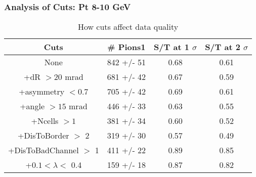 \frame
{
\frametitle{Analysis of Cuts: Pt  8-10 GeV}
\begin{table}
\caption{How cuts affect data quality}
\centering
\begin{tabular}{c c c c}
\hline\hline
Cuts & \# Pions1 & S/T at 1 $\sigma$ & S/T at 2 $\sigma$ \\ [0.5ex]
\hline
None &  842 +/-   51 & 0.68 & 0.61 \\ %
+dR $> 20$ mrad &  681 +/-   42 & 0.67 & 0.59 \\ %
+asymmetry $< 0.7$ &  705 +/-   42 & 0.69 & 0.61 \\ %
+angle $> 15$ mrad &  446 +/-   33 & 0.63 & 0.55 \\ %
+Ncells $> 1$&  381 +/-   34 & 0.60 & 0.52 \\ %
+DisToBorder $>$ 2 &  319 +/-   30 & 0.57 & 0.49 \\ %
+DisToBadChannel $>$ 1&  411 +/-   22 & 0.89 & 0.85 \\ %
+$0.1 < \lambda <$ 0.4 &  159 +/-   18 & 0.87 & 0.82 \\ %
[1ex]
\hline
\end{tabular}
\label{table:nonlin}
\end{table}
}
